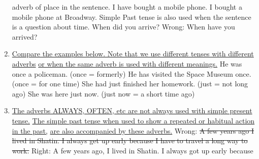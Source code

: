 \begin{enumerate}
        adverb of place in the sentence.
        \newline
        \newline
        I have bought a mobile phone.
        \newline
        \newline
        I bought a mobile phone at Broadway.
        \newline
        \newline
        Simple Past tense is also used when the sentence is a question about
        time.
        \newline
        \newline
        When did you arrive?
        \newline
        \newline
        Wrong: When have you arrived?
    \item \underline{Compare the examples below. Note that we use different
        tenses with different adverbs}
        \newline
        \underline{or when the same adverb is used with different meanings.}
        \newline
        \newline
        He was once a policeman. (once = formerly)
        \newline
        \newline
        He has visited the Space Museum once. (once = for one time)
        \newline
        \newline
        She had just finished her homework. (just = not long ago)
        \newline
        \newline
        She was here just now. (just now = a short time ago)
    \item \underline{The adverbs ALWAYS, OFTEN, etc are not always used with
        simple present tense.}
        \newline
        \underline{The simple past tense when used to show a repeated or
        habitual action in the past,}
        \underline{are also accompanied by these adverbs.}
        \newline
        \newline
        Wrong: \st{A few years ago I lived in Shatin. I always get up early
        because I have to travel a long way to work.}
        \newline
        \newline
        Right: A few years ago, I lived in Shatin. I always got up early because

\end{enumerate}
